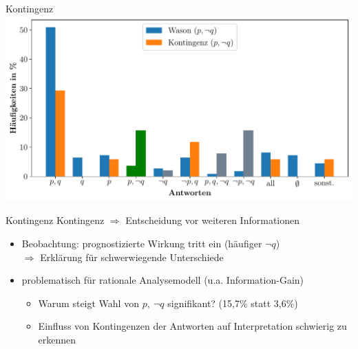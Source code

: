 \begin{frame}{Kontingenz {\scriptsize \cite[S.~109]{stenningHumanReasoningCognitive2008}}}
    \includegraphics[width=\textwidth]{../plot/results_contingency.pdf}
\end{frame}


\begin{frame}{Kontingenz {\scriptsize \cite[S.~105,109]{stenningHumanReasoningCognitive2008}}}
    Kontingenz $\Rightarrow$ Entscheidung vor weiteren Informationen
    \begin{itemize}
        \item Beobachtung: prognostizierte Wirkung tritt ein {\small (häufiger $\lnot q$)} \\
            $\Rightarrow$ Erklärung für schwerwiegende Unterschiede
        
        \item problematisch für rationale Analysemodell {\small (u.a. Information-Gain)}
        \begin{itemize}
            \item Warum steigt Wahl von $p,~\lnot q$ signifikant? (15,7\% statt 3,6\%)
            \item Einfluss von Kontingenzen der Antworten auf Interpretation schwierig zu erkennen
        \end{itemize}
    \end{itemize}
\end{frame}


